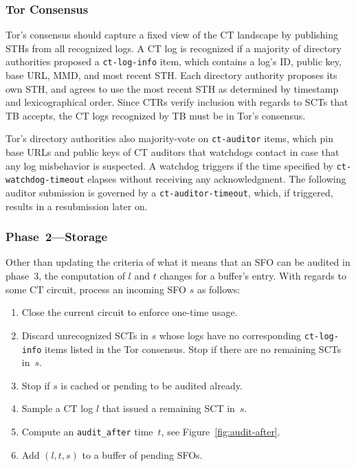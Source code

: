 \subsubsection{Tor Consensus} \label{sec:auditor:design:consensus}
Tor's consensus should capture a fixed view of the CT landscape by publishing
STHs from all recognized logs.  A CT log is recognized if a majority of directory
authorities proposed a \texttt{ct-log-info} item, which contains a log's ID,
public key, base URL, MMD, and most recent STH.  Each directory authority
proposes its own STH, and agrees to use the most recent STH as determined by
timestamp and lexicographical order.  Since CTRs verify inclusion with regards
to SCTs that TB accepts, the CT logs recognized by TB must be
in Tor's consensus.

Tor's directory authorities also majority-vote on \texttt{ct-auditor} items,
which pin base URLs and public keys of CT auditors that watchdogs contact in
case that any log misbehavior is suspected.  A watchdog triggers if the time
specified by \texttt{ct-watchdog-timeout} elapses without receiving any
acknowledgment.  The following auditor submission is governed by a
\texttt{ct-auditor-timeout}, which, if triggered, results in a resubmission
later on.

\subsubsection{Phase~2---Storage} \label{sec:auditor:design:phase2}
Other than updating the criteria of what it means that an SFO can be audited
in phase~3, the computation of $l$ and $t$ changes for a buffer's entry.  With
regards to some CT circuit, process an incoming SFO $s$ as follows:
\begin{enumerate}
	\item\label{enm:ext:storage:close} Close the current circuit to enforce
		one-time usage.
	\item\label{enm:ext:storage:unrecognized} Discard unrecognized SCTs in $s$
		whose logs have no corresponding \texttt{ct-log-info} items listed in
		the Tor consensus.  Stop if there are no remaining SCTs in~$s$.
	\item\label{enm:ext:storage:cached}
		Stop if $s$ is cached or pending to be audited already.
	\item\label{enm:ext:storage:fix-log} Sample a CT log $l$ that issued a
		remaining SCT in~$s$.
	\item\label{enm:storage:audit-after} Compute an \texttt{audit\_after}
		time~$t$, see Figure~\ref{fig:audit-after}.
	\item\label{enm:storage:store} Add $(l,t,s)$ to a buffer of pending SFOs.
\end{enumerate}

